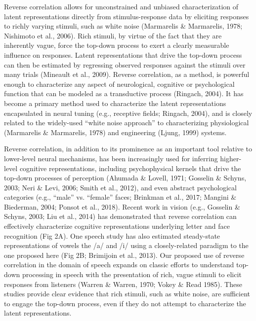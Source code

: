 \documentclass[11pt, notitlepage]{article} %
\begin{document}
Reverse correlation allows for unconstrained and unbiased
characterization of latent representations directly from stimulus-response data by eliciting responses to
richly varying stimuli, such as white noise (Marmarelis \& Marmarelis, 1978; Nishimoto et al., 2006).
Rich stimuli, by virtue of the fact that they are inherently vague, force the top-down process to exert a clearly
measurable influence on responses. Latent representations that drive the top-down process can then be
estimated by regressing observed responses against the stimuli over many trials (Mineault et al., 2009).
Reverse correlation, as a method, is powerful enough to characterize any aspect of neurological,
cognitive or psychological function that can be modeled as a transductive process (Ringach, 2004). It has
become a primary method used to characterize the latent representations encapsulated in neural tuning
(e.g., receptive fields; Ringach, 2004), and is closely related to the widely-used “white noise approach” to
characterizing physiological (Marmarelis \& Marmarelis, 1978) and engineering (Ljung, 1999) systems. 

Reverse correlation, in addition to its prominence as an important tool relative to lower-level
neural mechanisms, has been increasingly used for inferring higher-level cognitive representations,
including psychophysical kernels that drive the top-down processes of perception (Ahumada \& Lovell,
1971; Gosselin \& Schyns, 2003; Neri \& Levi, 2006; Smith et al., 2012), and even abstract psychological
categories (e.g., “male” vs. “female” faces; Brinkman et al., 2017; Mangini \& Biederman, 2004; Ponsot et
al., 2018). Recent work in vision (e.g., Gosselin \& Schyns, 2003; Liu et al., 2014) has demonstrated that
reverse correlation can effectively characterize cognitive representations underlying letter and face
recognition (Fig 2A). One speech study has also estimated steady-state representations of vowels the /a/
and /i/ using a closely-related paradigm to the one proposed here (Fig 2B; Brimijoin et al., 2013). Our
proposed use of reverse correlation in the domain of speech expands on classic efforts to understand
top-down processing in speech with the presentation of rich, vague stimuli to elicit responses from
listeners (Warren \& Warren, 1970; Vokey \& Read 1985). These studies provide clear evidence that rich
stimuli, such as white noise, are sufficient to engage the top-down process, even if they do not attempt to
characterize the latent representations.
\end{document}
